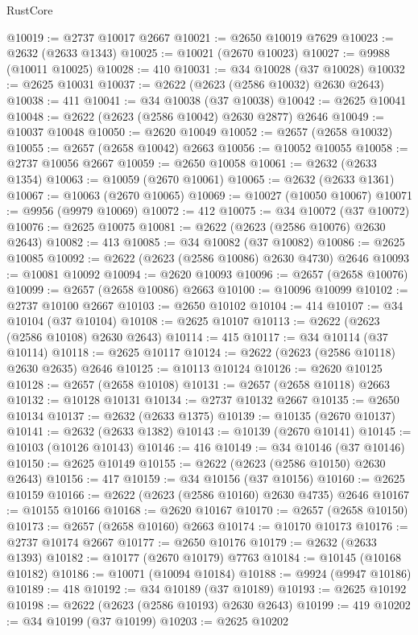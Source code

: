 \begin{lexlean}{RustCore}
\begin{coremodule}
@10019 := @2737 @10017 @2667
@10021 := @2650 @10019 @7629
@10023 := @2632 (@2633 @1343)
@10025 := @10021 (@2670 @10023)
@10027 := @9988 (@10011 @10025)
@10028 := 410
@10031 := @34 @10028 (@37 @10028)
@10032 := @2625 @10031
@10037 := @2622 (@2623 (@2586 @10032) @2630 @2643)
@10038 := 411
@10041 := @34 @10038 (@37 @10038)
@10042 := @2625 @10041
@10048 := @2622 (@2623 (@2586 @10042) @2630 @2877) @2646
@10049 := @10037 @10048
@10050 := @2620 @10049
@10052 := @2657 (@2658 @10032)
@10055 := @2657 (@2658 @10042) @2663
@10056 := @10052 @10055
@10058 := @2737 @10056 @2667
@10059 := @2650 @10058
@10061 := @2632 (@2633 @1354)
@10063 := @10059 (@2670 @10061)
@10065 := @2632 (@2633 @1361)
@10067 := @10063 (@2670 @10065)
@10069 := @10027 (@10050 @10067)
@10071 := @9956 (@9979 @10069)
@10072 := 412
@10075 := @34 @10072 (@37 @10072)
@10076 := @2625 @10075
@10081 := @2622 (@2623 (@2586 @10076) @2630 @2643)
@10082 := 413
@10085 := @34 @10082 (@37 @10082)
@10086 := @2625 @10085
@10092 := @2622 (@2623 (@2586 @10086) @2630 @4730) @2646
@10093 := @10081 @10092
@10094 := @2620 @10093
@10096 := @2657 (@2658 @10076)
@10099 := @2657 (@2658 @10086) @2663
@10100 := @10096 @10099
@10102 := @2737 @10100 @2667
@10103 := @2650 @10102
@10104 := 414
@10107 := @34 @10104 (@37 @10104)
@10108 := @2625 @10107
@10113 := @2622 (@2623 (@2586 @10108) @2630 @2643)
@10114 := 415
@10117 := @34 @10114 (@37 @10114)
@10118 := @2625 @10117
@10124 := @2622 (@2623 (@2586 @10118) @2630 @2635) @2646
@10125 := @10113 @10124
@10126 := @2620 @10125
@10128 := @2657 (@2658 @10108)
@10131 := @2657 (@2658 @10118) @2663
@10132 := @10128 @10131
@10134 := @2737 @10132 @2667
@10135 := @2650 @10134
@10137 := @2632 (@2633 @1375)
@10139 := @10135 (@2670 @10137)
@10141 := @2632 (@2633 @1382)
@10143 := @10139 (@2670 @10141)
@10145 := @10103 (@10126 @10143)
@10146 := 416
@10149 := @34 @10146 (@37 @10146)
@10150 := @2625 @10149
@10155 := @2622 (@2623 (@2586 @10150) @2630 @2643)
@10156 := 417
@10159 := @34 @10156 (@37 @10156)
@10160 := @2625 @10159
@10166 := @2622 (@2623 (@2586 @10160) @2630 @4735) @2646
@10167 := @10155 @10166
@10168 := @2620 @10167
@10170 := @2657 (@2658 @10150)
@10173 := @2657 (@2658 @10160) @2663
@10174 := @10170 @10173
@10176 := @2737 @10174 @2667
@10177 := @2650 @10176
@10179 := @2632 (@2633 @1393)
@10182 := @10177 (@2670 @10179) @7763
@10184 := @10145 (@10168 @10182)
@10186 := @10071 (@10094 @10184)
@10188 := @9924 (@9947 @10186)
@10189 := 418
@10192 := @34 @10189 (@37 @10189)
@10193 := @2625 @10192
@10198 := @2622 (@2623 (@2586 @10193) @2630 @2643)
@10199 := 419
@10202 := @34 @10199 (@37 @10199)
@10203 := @2625 @10202

\end{coremodule}
\end{lexlean}
